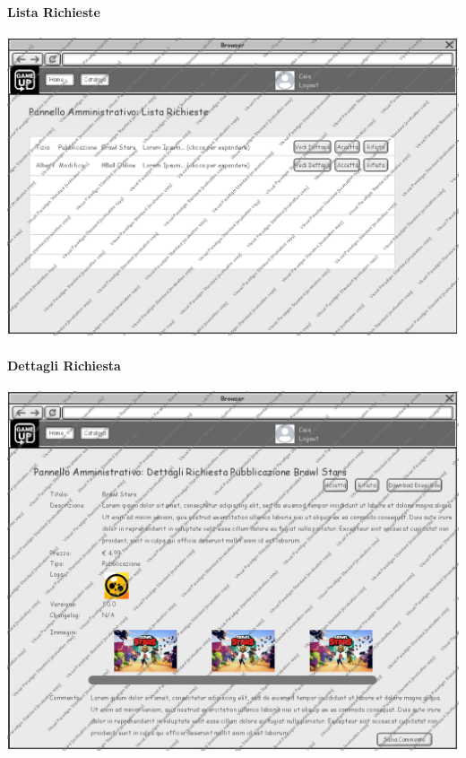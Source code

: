 \newpage
\paragraph{Lista Richieste}
\begin{center}
\includegraphics[width=\textwidth,height=\textheight,keepaspectratio]{Figure/Mockups/ListaRichiesteVideogioco.jpg}
\end{center}

\newpage
\paragraph{Dettagli Richiesta}
\begin{center}
\includegraphics[width=\textwidth,height=\textheight,keepaspectratio]{Figure/Mockups/DettagliRichiesta.jpg}
\end{center}

